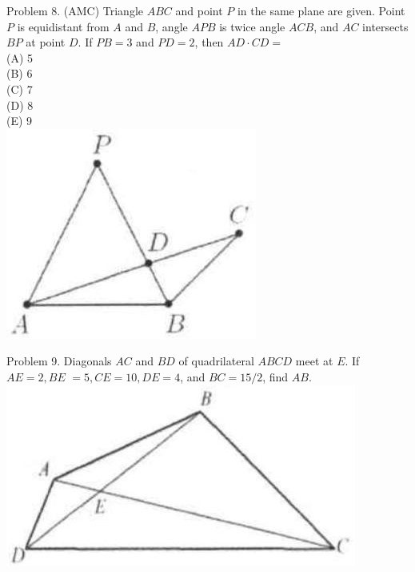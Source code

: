 \documentclass[10pt]{article}
\begin{document}
Problem 8. (AMC) Triangle \(A B C\) and point \(P\) in the same plane are given. Point \(P\) is equidistant from \(A\) and \(B\), angle \(A P B\) is twice angle \(A C B\), and \(A C\) intersects \(B P\) at point \(D\). If \(P B=3\) and \(P D=2\), then \(A D \cdot C D=\)\\
(A) 5\\
(B) 6\\
(C) 7\\
(D) 8\\
(E) 9\\
\includegraphics[max width=\textwidth, center]{2025_04_17_97bc1f7e44d93c271a88g-207(2)}

Problem 9. Diagonals \(A C\) and \(B D\) of quadrilateral \(A B C D\) meet at \(E\). If \(A E=2, B E\) \(=5, C E=10, D E=4\), and \(B C=15 / 2\), find \(A B\).\\
\includegraphics[max width=\textwidth, center]{2025_04_17_97bc1f7e44d93c271a88g-207}
\end{document}
